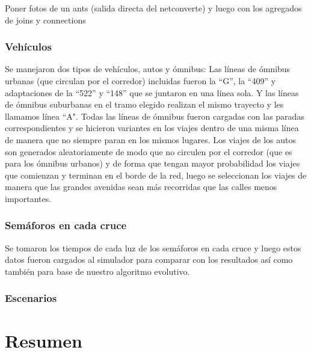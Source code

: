 Poner fotos de un ants (salida directa del netconverte) y luego con los agregados de joins y connections


\subsubsection{Vehículos}
Se manejaron dos tipos de vehículos, autos y ómnibus:
Las  líneas  de  ómnibus  urbanas  (que  circulan  por  el
corredor)  incluidas  fueron  la  “G”,  la  “409”  y
adaptaciones  de  la  “522”  y  “148”  que  se  juntaron  en
una  línea  sola. Y  las líneas de ómnibus suburbanas en
el  tramo  elegido  realizan  el  mismo  trayecto  y  les
llamamos  línea  “A".  Todas  las  líneas  de  ómnibus
fueron cargadas con las paradas correspondientes y se
hicieron  variantes  en  los  viajes  dentro  de  una  misma
línea de manera que no siempre paran en los mismos
lugares.
Los  viajes  de  los  autos  son  generados  aleatoriamente
de modo que no circulen por el corredor (que es para
los  ómnibus  urbanos)  y  de  forma  que  tengan  mayor
probabilidad los viajes que comienzan y terminan en el
borde  de  la  red,  luego  se  seleccionan  los  viajes  de
manera  que  las  grandes  avenidas  sean  más  recorridas
que  las  calles  menos  importantes.

\subsubsection{Semáforos en cada cruce}
Se  tomaron  los  tiempos  de  cada  luz  de  los  semáforos  en
cada  cruce  y  luego  estos  datos  fueron  cargados  al  simulador
para comparar con los  resultados  así como también para base
de nuestro algoritmo evolutivo.
\subsubsection{Escenarios}


\section{Resumen}

